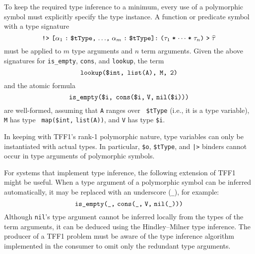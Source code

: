 
 To keep the required type
inference to a minimum, every use of a polymorphic symbol must explicitly
specify the type instance. A function or predicate symbol with a type signature
\[\hbox{{\tt !>} {\tt [$\alpha_1$\;:\;\$tType,\;${\dots}$,\;$\alpha_m$\;:\;\$tType]:\;%
($\tau_1$\;*\;${\cdots}$\;*\;$\tau_n$)\;>\;$\widehat \tau$}}\]
must be applied to $m$ type arguments and $n$ term arguments. Given the above
signatures for {\tt is\_empty}, {\tt cons}, and {\tt lookup}, the term
\[\hbox{\tt lookup(\$int,\;\,list(A),\;\,M,\;\,2)}\]
and the atomic formula
\[\hbox{\tt is\_empty(\$i,\;\,cons(\$i,\;V,\;nil(\$i)))}\]
are well-formed, assuming that {\tt A} ranges over {\tt
\$tType} (i.e., it is a type variable), {\tt M} has type {\tt
map(\$int,} {\tt list(A))}, and {\tt V} has type {\tt \$i}.

In keeping with TFF1's rank-1 polymorphic nature, type variables can only be
instantiated with actual types. In particular, \verb+$o+, \verb+$tType+,
and {\tt |>} binders cannot occur in type arguments of polymorphic symbols.

For systems that implement type inference, the following extension
of TFF1 might be useful. When a type argument of
a polymorphic symbol can be inferred automatically, it may be
replaced with an underscore ({\tt \_}), for example:
\[\hbox{{\tt is\_empty(\_,} {\tt cons(\_,\;V,\;nil(\_)))}}\]
Although {\tt nil}'s type argument cannot be inferred locally from the types of
the term arguments, it can be deduced using the Hindley--Milner type inference.
The producer of a TFF1 problem must be aware of the type inference algorithm
implemented in the consumer to omit only the redundant type arguments.

